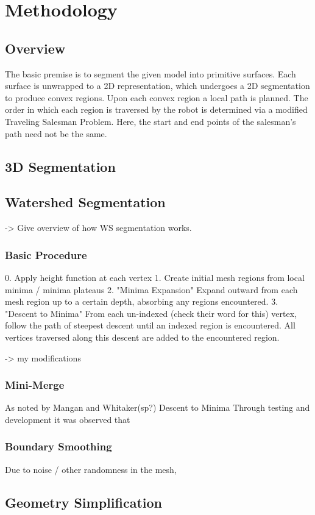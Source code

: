 \chapter{Methodology}

\section{Overview}
The basic premise is to segment the given model into primitive surfaces.
Each surface is unwrapped to a 2D representation, which undergoes a 2D segmentation to produce convex regions.
Upon each convex region a local path is planned.
The order in which each region is traversed by the robot is determined via a modified Traveling Salesman Problem.
Here, the start and end points of the salesman's path need not be the same.

\section{3D Segmentation}


\section{Watershed Segmentation}
-> Give overview of how WS segmentation works.

\subsection{Basic Procedure}
0. Apply height function at each vertex
1. Create initial mesh regions from local minima / minima plateaus
2. "Minima Expansion" Expand outward from each mesh region up to a certain depth, absorbing any regions encountered.
3. "Descent to Minima" From each un-indexed (check their word for this) vertex, follow the path of steepest descent until an indexed region is encountered.
All vertices traversed along this descent are added to the encountered region.

-> my modifications
\subsection{Mini-Merge}
As noted by Mangan and Whitaker(sp?) Descent to Minima Through testing and development it was observed that

\subsection{Boundary Smoothing}
Due to noise / other randomness in the mesh,


\section{Geometry Simplification}

